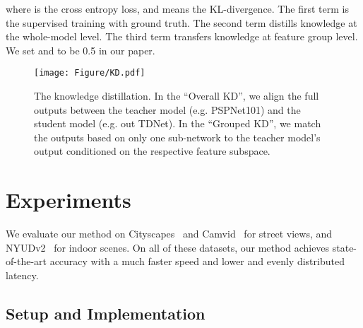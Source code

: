 \documentclass[10pt,twocolumn,letterpaper]{article}
\begin{document}
\noindent where  is the cross entropy loss, and  means the KL-divergence. The first term is the supervised training with ground truth. The second term distills knowledge at the whole-model level. The third term transfers knowledge at feature group level. We set  and  to be 0.5 in our paper.

\begin{figure}
\centering
\texttt{[image: Figure/KD.pdf]}
\vspace{-0.1cm}
\caption{\small{The knowledge distillation. In the ``Overall KD'', we align the  full outputs between the teacher model (e.g. PSPNet101) and the student model (e.g. out TDNet). In the ``Grouped KD'', we match the outputs  based on only one sub-network to the teacher model's output conditioned on the respective feature subspace.}}
\label{fig4}
\vspace{-0.5cm}
\end{figure}
































%
 \section{Experiments}

We evaluate our method on Cityscapes~\cite{cordts2016cityscapes} and Camvid~\cite{brostow2008segmentation} for street views, and NYUDv2~\cite{Silberman12nyyd} for indoor scenes. 
On all of these datasets, our method achieves state-of-the-art accuracy with a much faster speed and lower and evenly distributed latency.

\subsection{Setup and Implementation}
\end{document}
